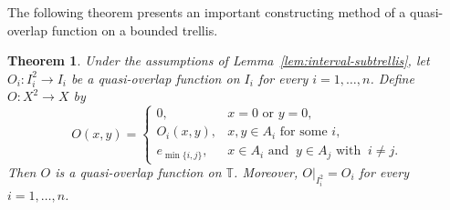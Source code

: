 \documentclass[preprint,12pt]{elsarticle}
\newtheorem{theorem}{Theorem}[section]
\begin{document}
The following theorem presents an important constructing method of a quasi-overlap function on a
bounded trellis.
\begin{theorem}\label{thm:gluing}
Under the assumptions of Lemma~\ref{lem:interval-subtrellis},
let $O_i:I_i^2\to I_i$ be a quasi-overlap function on
$I_i$ for every $i=1,\ldots,n$.
Define $O:X^2\to X$ by
$$
O(x,y)=
\begin{cases}
0,
& x=0\mbox{ or }y=0,\\[1mm]
O_i(x,y),
& x,y\in A_i\mbox{ for some }i,\\[1mm]
e_{\min\{i,j\}},
& x\in A_i\mbox{ and }\ y\in A_j\mbox{ with }\ i\neq j.
\end{cases}
$$
Then $O$ is a quasi-overlap function on $\mathbb{T}$.
Moreover,
$
O|_{I_i^2}=O_i
$
for every $i=1,\ldots,n$.
\end{theorem}
\end{document}
